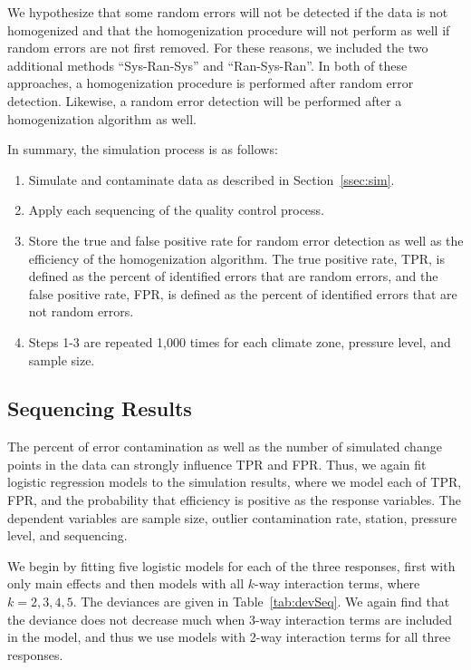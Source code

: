 \documentclass[12pt]{article}
\begin{document}
\begin{doublespacing}
We hypothesize that some random errors will not be detected if the data is not homogenized and that the homogenization procedure will not perform as well if random errors are not first removed.  For these reasons, we included the two additional methods ``Sys-Ran-Sys'' and ``Ran-Sys-Ran''.  In both of these approaches, a homogenization procedure is performed after random error detection.  Likewise, a random error detection will be performed after a homogenization algorithm as well.

In summary, the simulation process is as follows:

\begin{enumerate}
	\item Simulate and contaminate data as described in Section~\ref{ssec:sim}.
	\item Apply each sequencing of the quality control process.
	\item Store the true and false positive rate for random error detection as well as the efficiency of the homogenization algorithm.  The true positive rate, TPR, is defined as the percent of identified errors that are random errors, and the false positive rate, FPR, is defined as the percent of identified errors that are not random errors.
	\item Steps 1-3 are repeated 1,000 times for each climate zone,  pressure level, and sample size.
\end{enumerate}

\subsection{Sequencing Results}

The percent of error contamination as well as the number of simulated change points in the data can strongly influence TPR and FPR.  Thus, we again fit logistic regression models to the simulation results, where we model each of TPR, FPR, and the probability that efficiency is positive as the response variables.  The dependent variables are sample size, outlier contamination rate, station, pressure level, and sequencing.

We begin by fitting five logistic models for each of the three responses, first with only main effects and then models with all $k$-way interaction terms, where $k=2,3,4,5$.  The deviances are given in Table~\ref{tab:devSeq}.  We again find that the deviance does not decrease much when 3-way interaction terms are included in the model, and thus we use models with 2-way interaction terms for all three responses.


\end{doublespacing}
\end{document}
